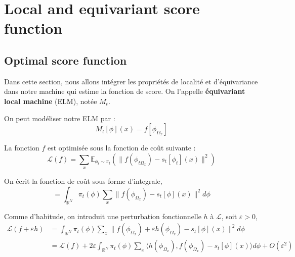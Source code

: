 \documentclass[a4paper,10pt]{article}
\theoremstyle{definition} %
\theoremstyle{definition} %
\theoremstyle{definition} %
\theoremstyle{definition} %
\newcommand{\R}{\mathbb{R}}
\begin{document}

\section{Local and equivariant score function}
\subsection{Optimal score function}
Dans cette section, nous allons intégrer les propriétés de localité et d'équivariance dans notre machine qui estime la fonction de score. On l'appelle \textbf{équivariant local machine} (ELM), notée $M_t$.

On peut modéliser notre ELM par :
\begin{equation*}
    M_t[\phi](x) = f \left[ \phi_{\Omega_x} \right]
\end{equation*}

La fonction $f$ est optimisée sous la fonction de coût suivante :
\begin{equation*}
    \mathcal{L}(f) = \sum\limits_x \mathbb{E}_{\phi_t \sim \pi_t} \left( \| f(\phi_{t\Omega_x}) - s_t [\phi_t](x) \|^2 \right)
\end{equation*}

On écrit la fonction de coût sous forme d'integrale,
\begin{equation*}
    = \int_{\R^N} \pi_t(\phi) \sum\limits_x \| f(\phi_{\Omega_x}) - s_t [\phi](x) \|^2 d\phi
\end{equation*}

Comme d'habitude, on introduit une perturbation fonctionnelle $h$ à $\mathcal{L}$, soit $\varepsilon > 0$,
\begin{align*}
    \mathcal{L}(f + \varepsilon h) &= \int_{\R^N} \pi_t(\phi) \sum\limits_x \| f(\phi_{\Omega_x}) + \varepsilon h(\phi_{\Omega_x}) - s_t [\phi](x) \|^2 d\phi\\
    &= \mathcal{L}(f) + 2\varepsilon \int_{\R^N} \pi_t(\phi) \sum\limits_x \langle h(\phi_{\Omega_x}), f(\phi_{\Omega_x}) - s_t [\phi](x) \rangle d\phi + O(\varepsilon^2)
\end{align*}
\end{document}
